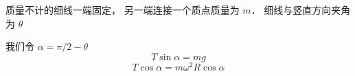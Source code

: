 
\begin{issues}
\issueDraft
\end{issues}



质量不计的细线一端固定， 另一端连接一个质点质量为 $m$． 细线与竖直方向夹角为 $\theta$

我们令 $\alpha = \pi/2 - \theta$
\begin{equation}
T\sin\alpha = mg
\end{equation}
\begin{equation}
T\cos\alpha = m\omega^2 R\cos\alpha
\end{equation}

